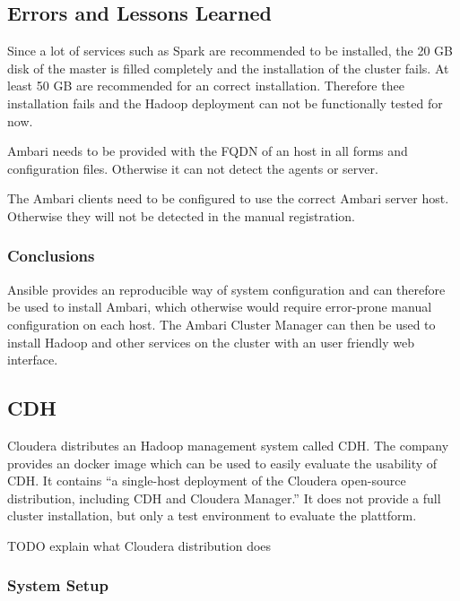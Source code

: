 \subsection{Errors and Lessons Learned}
\label{sec:ambari:errors}
Since a lot of services such as Spark are recommended to be installed, 
the 20 \ac{GB} disk of the master is filled completely and the installation of the cluster fails. At least 50 \ac{GB} are recommended for an correct installation.
Therefore thee installation fails and the Hadoop deployment can not be functionally tested for now.

Ambari needs to be provided with the \ac{FQDN} of an host 
in all forms and configuration files. 
Otherwise it can not detect the agents or server.

The Ambari clients need to be configured 
to use the correct Ambari server host.
Otherwise they will not be detected in the manual registration.


\subsubsection{Conclusions}
Ansible provides an reproducible way of system configuration 
and can therefore be used to install Ambari, 
which otherwise would require error-prone manual configuration on each host.
The Ambari Cluster Manager can then be used to install Hadoop and other services on the cluster with an user friendly web interface.


\subsection{\acl{CDH}}

Cloudera distributes an Hadoop management system called \ac{CDH}.
The company provides an docker image which can be used to easily evaluate the usability of \ac{CDH}.
It contains \enquote{a single-host deployment of the Cloudera open-source distribution, including CDH and Cloudera Manager.} \autocite[][]{cloudera2018docker}
It does not provide a full cluster installation, but only a test environment to evaluate the plattform.

TODO explain what Cloudera distribution does


\subsubsection{System Setup}

